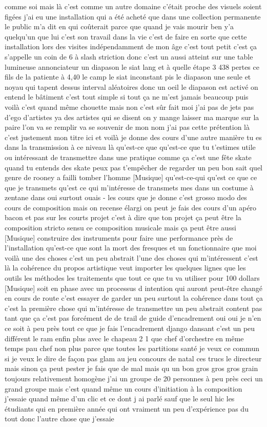 comme soi mais là c'est comme un autre domaine c'était proche des visuels soient figées j'ai eu une installation qui a été acheté que dans une collection permanente le public m'a dit en qui coûterait parce que quand je vais mourir ben y'a quelqu'un que lui c'est son travail dans la vie c'est de faire en sorte que cette installation lors des visites indépendamment de mon âge c'est tout petit c'est ça s'appelle un coin de 6 à slash striction donc c'est un aussi atteint sur une table lumineuse annonciateur un diapason le siat lang et à quelle étape 3 438 pertes ce fils de la patiente à 4,40 le camp le siat inconstant pis le diapason une seule et noyau qui tapent dessus interval aléatoires donc un oeil le diapason est activé on entend le bâtiment c'est tout simple si tout ça ne m'est jamais beaucoup puis voilà c'est quand même chouette mais non c'est sûr fait moi j'ai pas de jets pas d'ego d'artistes ya des artistes qui se disent on y mange laisser ma marque sur la paire l'on va se remplir va se souvenir de mon nom j'ai pas cette prétention là c'est justement mon titre ici et voilà je donne des cours d'une autre manière tu es dans la transmission à ce niveau là qu'est-ce que qu'est-ce que tu t'estimes utile ou intéressant de transmettre dans une pratique comme ça c'est une fête skate quand tu entends des skate peux pas t'empêcher de regarder un peu bon sait quel genre de rooney a failli tomber l'homme [Musique] qu'est-ce-qui qu'est ce que ce que je transmets qu'est ce qui m'intéresse de transmets mes dans un costume à zentane dans oui surtout ouais - les cours que je donne c'est grosso modo des cours de composition mais on recense élargi on peut je fais des cours d'un apéro bacon et pas sur les courts projet c'est à dire que ton projet ça peut être la composition stricto sensu ce composition musicale mais ça peut être aussi [Musique] construire des instruments pour faire une performance près de l'installation qu'est-ce que sont la mort des fresques et un fonctionnaire que moi voilà une des choses c'est un peu abstrait l'une des choses qui m'intéressent c'est là la cohérence du propos artistique veut importer les quelques lignes que les outils les méthodes les traitements que tout ce que tu va utiliser pour 100 dollars [Musique] soit en phase avec un processus d intention qui auront peut-être changé en cours de route c'est essayer de garder un peu surtout la cohérence dans tout ça c'est la première chose qui m'intéresse de transmettre un peu abstrait content pas tant que ça c'est pas forcément de de trail de guide d'encadrement oui oui je n'en ce soit à peu près tout ce que je fais l'encadrement django dansant c'est un peu différent le ram enfin plus avec le chapeau 2 1 que chef d'orchestre en même temps pau chef non plus parce que toutes les partitions santé je veux ce commun si je veux le dire de façon pas glam au jeu concours de natal ces trucs le directeur mais sinon ça peut pester je fais que de mal mais qu un bon gros gros gros grain toujours relativement homogène j'ai un groupe de 20 personnes à peu près ceci un grand groupe mais c'est quand même un cours d'initiation à la composition j'essaie quand même d'un clic et ce dont j ai parlé sauf que le seul hic les étudiants qui en première année qui ont vraiment un peu d'expérience pas du tout donc l'autre chose que j'essaie 